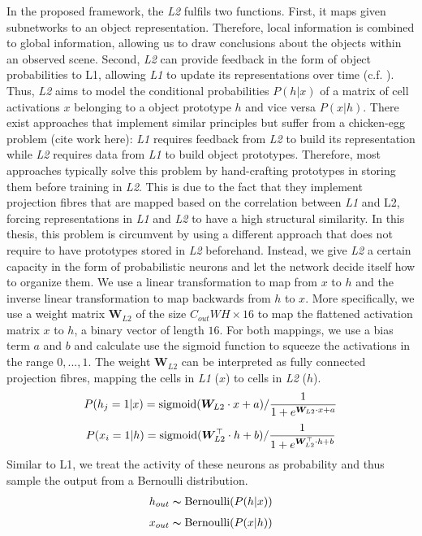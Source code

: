 In the proposed framework, the \emph{L2} fulfils two functions. First, it maps given subnetworks to an object representation. Therefore, local information is combined to global information, allowing us to draw conclusions about the objects within an observed scene. Second, \emph{L2} can provide feedback in the form of object probabilities to L1, allowing \emph{L1} to update its representations over time (c.f. ).
Thus, \emph{L2} aims to model the conditional probabilities $P(h|x)$ of a matrix of cell activations $x$ belonging to a object prototype $h$ and vice versa $P(x|h)$.
There exist approaches that implement similar principles but suffer from a chicken-egg problem (cite work here): \emph{L1} requires feedback from \emph{L2} to build its representation while \emph{L2} requires data from \emph{L1} to build object prototypes. Therefore, most approaches typically solve this problem by hand-crafting prototypes in storing them before training in \emph{L2}. This is due to the fact that they implement projection fibres that are mapped based on the correlation between \emph{L1} and L2, forcing representations in \emph{L1} and \emph{L2} to have a high structural similarity.
In this thesis, this problem is circumvent by using a different approach that does not require to have prototypes stored in \emph{L2} beforehand. Instead, we give \emph{L2} a certain capacity in the form of probabilistic neurons and let the network decide itself how to organize them. 
We use a linear transformation to map from $x$ to $h$ and the inverse linear transformation to map backwards from $h$ to $x$.
More specifically, we use a weight matrix $\boldsymbol{W}_{L2}$ of the size $C_{out}WH \times 16$ to map the flattened activation matrix $x$ to $h$, a binary vector of length $16$. For both mappings, we use a bias term $a$ and $b$ and calculate use the sigmoid function to squeeze the activations in the range $0, ..., 1$. 
The weight $\boldsymbol{W}_{L2}$ can be interpreted as fully connected projection fibres, mapping the cells in \emph{L1} ($x$) to cells in \emph{L2} ($h$).
\begin{align}\eqlbl{l2_1}
	P(h_j=1 | x) = \text{sigmoid}(\boldsymbol{W}_{L2} \cdot x + a) / \frac{1}{1 + e^{\boldsymbol{W}_{L2} \cdot x + a}}
\end{align}
\begin{align}\eqlbl{l2_2}
	P(x_i=1 | h) = \text{sigmoid}(\boldsymbol{W}_{L2}^\top \cdot h + b) / \frac{1}{1 + e^{\boldsymbol{W}_{L2}^\top \cdot h + b}}
\end{align}
Similar to L1, we treat the activity of these neurons as probability and thus sample the output from a Bernoulli distribution.
\begin{align}\eqlbl{l2_3}
	h_{out} \thicksim \text{Bernoulli}(P(h | x) )
\end{align}
\begin{align}\eqlbl{l2_4}
	x_{out} \thicksim \text{Bernoulli}(P(x | h))
\end{align}

